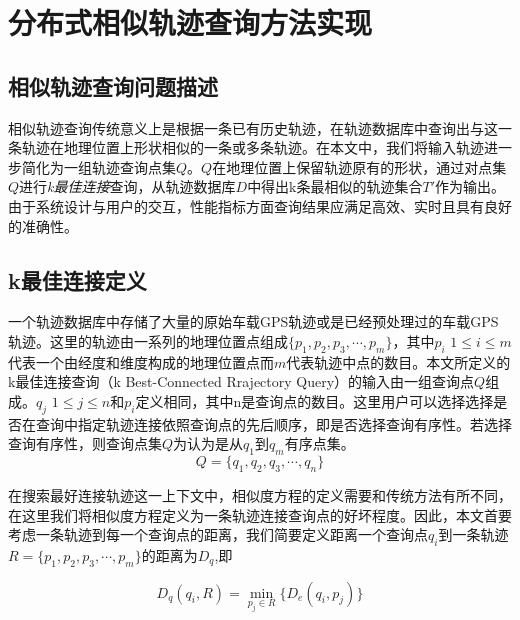 
\theoremstyle{definition}
\newtheorem{definition}{定义}[section]

\chapter{分布式相似轨迹查询方法实现}
\label{chap:implementation}

\section{相似轨迹查询问题描述}
\label{sec:question describe}
相似轨迹查询传统意义上是根据一条已有历史轨迹，在轨迹数据库中查询出与这一条轨迹在地理位置上形状相似的一条或多条轨迹。在本文中，我们将输入轨迹进一步简化为一组轨迹查询点集$Q$。$Q$在地理位置上保留轨迹原有的形状，通过对点集$Q$进行\emph{k最佳连接}查询，从轨迹数据库$D$中得出k条最相似的轨迹集合$T'$作为输出。由于系统设计与用户的交互，性能指标方面查询结果应满足高效、实时且具有良好的准确性。

\section{k最佳连接定义}
\label{sec:k-bct}
一个轨迹数据库中存储了大量的原始车载GPS轨迹或是已经预处理过的车载GPS轨迹。这里的轨迹由一系列的地理位置点组成$\{p_{1},p_{2},p_{3},\cdots, p_{m}\}$，其中$p_{i}$ $1\leq i \leq m$代表一个由经度和维度构成的地理位置点而$m$代表轨迹中点的数目。本文所定义的k最佳连接查询（k Best-Connected Rrajectory Query）的输入由一组查询点$Q$组成。$q_{j}$ $1 \leq j \leq n$和$p_{i}$定义相同，其中n是查询点的数目。这里用户可以选择选择是否在查询中指定轨迹连接依照查询点的先后顺序，即是否选择查询有序性。若选择查询有序性，则查询点集$Q$为认为是从$q_{1}$到$q_{m}$有序点集。
\begin{displaymath}
	Q = \{q_{1},q_{2},q_{3},\cdots, q_{n}\}
\end{displaymath}

在搜索最好连接轨迹这一上下文中，相似度方程的定义需要和传统方法有所不同，在这里我们将相似度方程定义为一条轨迹连接查询点的好坏程度。因此，本文首要考虑一条轨迹到每一个查询点的距离，我们简要定义距离一个查询点$q_{i}$到一条轨迹$R=\{p_{1},p_{2},p_{3},\cdots, p_{m}\}$的距离为$D_{q}$,即

\begin{equation}
	\label{eq3-1}
	D_{q}(q_{i}, R) = \min_{p_{j} \in R} \{D_{e}(q_{i}, p_{j})\} 
\end{equation}

